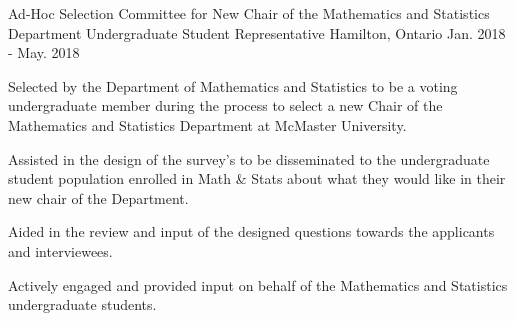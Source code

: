 \begin{cventries}


  \cventry
    {Ad-Hoc Selection Committee for New Chair of the Mathematics and Statistics Department} %
    {Undergraduate Student Representative} %
    {Hamilton, Ontario} %
    {Jan. 2018 - May. 2018} %
     {\renewcommand{\labelitemii}{\bullet}
      \begin{cvitems}%
        \item {Selected by the Department of Mathematics and Statistics to be a voting undergraduate member during the process to select a new Chair of the Mathematics and Statistics Department at McMaster University.}
        \item {Assisted in the design of the survey's to be disseminated to the undergraduate student population enrolled in Math \& Stats about what they would like in their new chair of the Department.}
        \item {Aided in the review and input of the designed questions towards the applicants and interviewees.}
        \item {Actively engaged and provided input on behalf of the Mathematics and Statistics undergraduate students.}
      \end{cvitems}
    }

\end{cventries}

